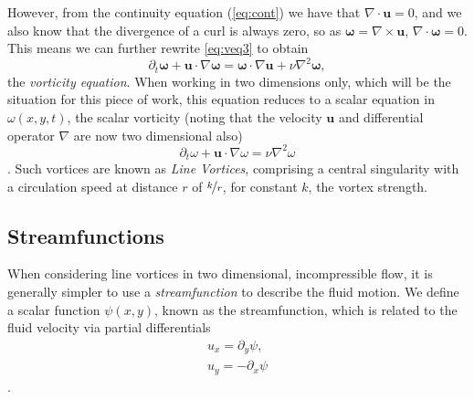 \documentclass[10pt, a4paper]{article}
\numberwithin{equation}{section}
\newcommand{\vel}{\bm{u}}
\newcommand{\del}{\nabla}
\newcommand{\deldot}{\nabla \cdot}
\newcommand{\delcross}{\nabla \times}
\newcommand{\bo}{\bm{\omega}}
\begin{document}
However, from the continuity equation (\cref{eq:cont}) we have that $\deldot\vel=0$, and we also know that the divergence of a curl is always zero, so as $\bo=\delcross\vel$, $\deldot\bo=0$.
This means we can further rewrite \cref{eq:veq3} to obtain
\begin{equation}
\partial_t \bo + \vel\cdot \del\bo = \bo \cdot \del\vel + \nu \del^2 \bo,
\label{eq:veq4}
\end{equation}
the \emph{vorticity equation}.
When working in two dimensions only, which will be the situation for this piece of work, this equation reduces to a scalar equation in $\omega(x,y,t)$, the scalar vorticity (noting that the velocity $\vel$ and differential operator $\del$ are now two dimensional also)
\begin{equation}
\partial_t \omega + \vel \cdot \del \omega = \nu \del^2 \omega
\label{eq:2dveq}
\end{equation}
\citep{wayne11}.
Such vortices are known as \emph{Line Vortices}, comprising a central singularity with a circulation speed at distance $r$ of $\nicefrac{k}{r}$, for constant $k$, the vortex strength.
\subsection{Streamfunctions}
When considering line vortices in two dimensional, incompressible flow, it is generally simpler to use a \emph{streamfunction} to describe the fluid motion. 
We define a scalar function $\psi(x,y)$, known as the streamfunction, which is related to the fluid velocity via partial differentials
\begin{align}
\label{eq:sf1}
u_x=\partial_y \psi,\\
\label{eq:sf2}
u_y=-\partial_x \psi
\end{align}
\citep{harlen14c1}.
\clearpage
\end{document}
